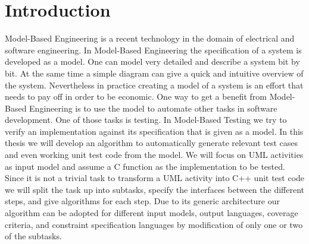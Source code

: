 \chapter{Introduction}
Model-Based Engineering is a recent technology in the domain of electrical and software engineering. In Model-Based Engineering the specification of a system is developed as a model.
One can model very detailed and describe a system bit by bit. At the same time a simple diagram can give a quick and intuitive overview of the system. 
Nevertheless in practice creating a model of a system is an effort that needs to pay off in order to be economic. 
One way to get a benefit from Model-Based Engineering is to use the model to automate other tasks in software development. One of those tasks is testing. In Model-Based Testing we try to verify an implementation against its specification that is given as a model. In this thesis we will develop an algorithm to automatically generate relevant test cases and even working unit test code from the model. We will focus on UML activities as input model and assume a C function as the implementation to be tested. Since it is not a trivial task to transform a UML activity into C++ unit test code we will split the task up into subtasks, specify the interfaces between the different steps, and give algorithms for each step. Due to its generic architecture our algorithm can be adopted for different input models, output languages, coverage criteria, and constraint specification languages by modification of only one or two of the subtasks.
